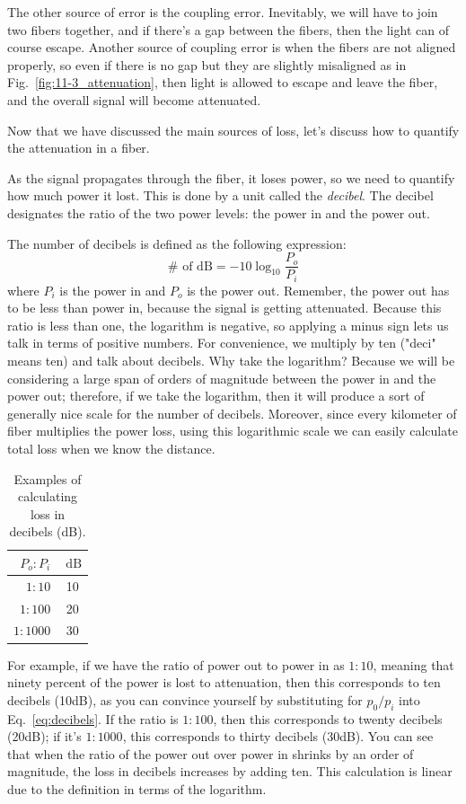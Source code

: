 The other source of error is the coupling error. Inevitably, we will have to join two fibers together, and if there's a gap between the fibers, then the light can of course escape. Another source of coupling error is when the fibers are not aligned properly, so even if there is no gap but they are slightly misaligned as in Fig.~\ref{fig:11-3_attenuation}, then light is allowed to escape and leave the fiber, and the overall signal will become attenuated.

Now that we have discussed the main sources of loss, let's discuss how to quantify the attenuation in a fiber.

As the signal propagates through the fiber, it loses power, so we need to quantify how much power it lost. This is done by a unit called the \emph{decibel}. The decibel designates the ratio of the two power levels: the power in and the power out.

The number of decibels is defined as the following expression:
\begin{equation}
\# \text { of } \mathrm{dB}=-10 \log _{10} \frac{P_o}{P_i}
\label{eq:decibels}
\end{equation}
where $P_i$ is the power in and $P_o$ is the power out. Remember, the power out has to be less than power in, because the signal is getting attenuated.  Because this ratio is less than one, the logarithm is negative, so applying a minus sign lets us talk in terms of positive numbers. For convenience, we multiply by ten ("deci" means ten) and talk about decibels. Why take the logarithm? Because we will be considering a large span of orders of magnitude between the power in and the power out; therefore, if we take the logarithm, then it will produce a sort of generally nice scale for the number of decibels.  Moreover, since every kilometer of fiber multiplies the power loss, using this logarithmic scale we can easily calculate total loss when we know the distance.

\begin{table}
\centering
\begin{tabular}{r|c}
$P_o: P_i$ & $\mathrm{~dB}$ \\
\hline $1: 10$ & 10 \\
$1: 100$ & 20 \\
$1: 1000$ & 30
\end{tabular}
\caption{Examples of calculating loss in decibels (dB).}
\label{tab:decibels}
\end{table}

For example, if we have the ratio of power out to power in as $1:10$, meaning that ninety percent of the power is lost to attenuation, then this corresponds to ten decibels (10dB), as you can convince yourself by substituting for $p_0/p_i$ into Eq.~\ref{eq:decibels}. If the ratio is $1:100$, then this corresponds to twenty decibels (20dB); if it's $1:1000$, this corresponds to thirty decibels (30dB). You can see that when the ratio of the power out over power in shrinks by an order of magnitude, the loss in decibels increases by adding ten. This calculation is linear due to the definition in terms of the logarithm.

